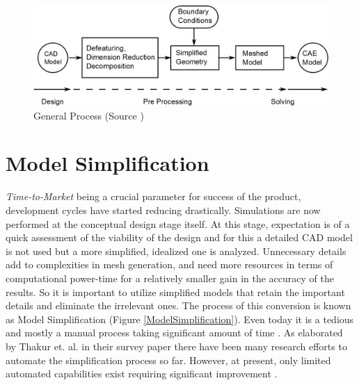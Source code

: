 	\begin{figure} [h]
		\centering
		\includegraphics[width=0.9\linewidth]{..//Common/images/CADCAEGeneralProcess.png}
		\vspace{\abovecaptionskip}
		\caption{General Process (Source \cite{Tierney2013})}
		\label{CADCAEGeneralProcess}
	\end{figure}



\section{Model Simplification}

{\em Time-to-Market} being a crucial parameter for success of the product, development cycles have started reducing drastically. Simulations are now performed at the conceptual design stage itself. At this stage, expectation is of a quick assessment of the viability of the design and for this a detailed CAD model is not used but a more simplified, idealized one is analyzed. Unnecessary details add to complexities in mesh generation, and need more resources in terms of computational power-time for a relatively smaller gain in the accuracy of the results. So it is important to utilize simplified models that retain the important details and eliminate the irrelevant ones. The process of this conversion is known as Model Simplification (Figure \ref{ModelSimplification}). Even today it is a tedious and mostly a manual process taking significant amount of time \cite{Russ2012}. As elaborated by Thakur et. al.  in their survey paper \cite{Thakur2009} there have been many research efforts to automate the simplification process so far. However, at present, only limited automated capabilities exist requiring significant improvement \cite{Lee2009}.
	

